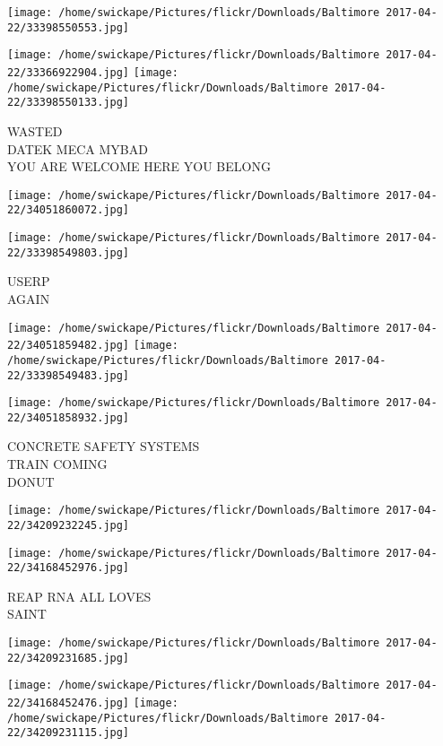 \documentclass[10pt,letterpaper]{article}
\begin{document}
\texttt{[image: /home/swickape/Pictures/flickr/Downloads/Baltimore 2017-04-22/33398550553.jpg]}

\vspace{0.25in}
\texttt{[image: /home/swickape/Pictures/flickr/Downloads/Baltimore 2017-04-22/33366922904.jpg]}
\texttt{[image: /home/swickape/Pictures/flickr/Downloads/Baltimore 2017-04-22/33398550133.jpg]}

WASTED\\
DATEK MECA MYBAD\\
YOU ARE WELCOME HERE YOU BELONG
\pagebreak

\texttt{[image: /home/swickape/Pictures/flickr/Downloads/Baltimore 2017-04-22/34051860072.jpg]}

\vspace{0.25in}
\texttt{[image: /home/swickape/Pictures/flickr/Downloads/Baltimore 2017-04-22/33398549803.jpg]}

USERP\\
AGAIN
\pagebreak

\texttt{[image: /home/swickape/Pictures/flickr/Downloads/Baltimore 2017-04-22/34051859482.jpg]}
\texttt{[image: /home/swickape/Pictures/flickr/Downloads/Baltimore 2017-04-22/33398549483.jpg]}

\texttt{[image: /home/swickape/Pictures/flickr/Downloads/Baltimore 2017-04-22/34051858932.jpg]}

CONCRETE SAFETY SYSTEMS\\
TRAIN COMING\\
DONUT
\pagebreak

\texttt{[image: /home/swickape/Pictures/flickr/Downloads/Baltimore 2017-04-22/34209232245.jpg]}

\vspace{0.25in}
\texttt{[image: /home/swickape/Pictures/flickr/Downloads/Baltimore 2017-04-22/34168452976.jpg]}

REAP RNA ALL LOVES\\
SAINT
\pagebreak

\texttt{[image: /home/swickape/Pictures/flickr/Downloads/Baltimore 2017-04-22/34209231685.jpg]}

\vspace{0.25in}
\texttt{[image: /home/swickape/Pictures/flickr/Downloads/Baltimore 2017-04-22/34168452476.jpg]}
\texttt{[image: /home/swickape/Pictures/flickr/Downloads/Baltimore 2017-04-22/34209231115.jpg]}
\end{document}
